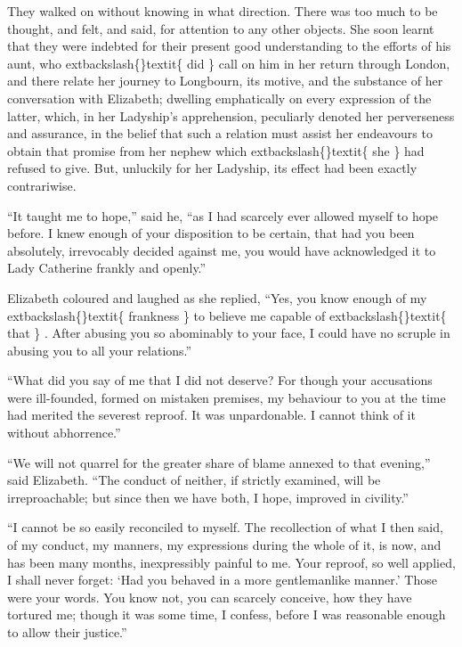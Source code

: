 \documentclass[10pt]{book}
\begin{document}
   They walked on without knowing in what direction. There was too much to
be thought, and felt, and said, for attention to any other objects. She
soon learnt that they were indebted for their present good understanding
to the efforts of his aunt, who
   	extbackslash\{\}textit\{
    did
   \}
   call on him in her return through
London, and there relate her journey to Longbourn, its motive, and the
substance of her conversation with Elizabeth; dwelling emphatically on
every expression of the latter, which, in her Ladyship’s apprehension,
peculiarly denoted her perverseness and assurance, in the belief that
such a relation must assist her endeavours to obtain that promise from
her nephew which
   	extbackslash\{\}textit\{
    she
   \}
   had refused to give. But, unluckily for her
Ladyship, its effect had been exactly contrariwise.
  

   “It taught me to hope,” said he, “as I had scarcely ever allowed myself
to hope before. I knew enough of your disposition to be certain, that
had you been absolutely, irrevocably decided against me, you would have
acknowledged it to Lady Catherine frankly and openly.”
  

   Elizabeth coloured and laughed as she replied, “Yes, you know enough of
my
   	extbackslash\{\}textit\{
    frankness
   \}
   to believe me capable of
   	extbackslash\{\}textit\{
    that
   \}
   . After abusing you so
abominably to your face, I could have no scruple in abusing you to all
your relations.”
  

   “What did you say of me that I did not deserve? For though your
accusations were ill-founded, formed on mistaken premises, my behaviour
to you at the time had merited the severest reproof. It was
unpardonable. I cannot think of it without abhorrence.”
  

   “We will not quarrel for the greater share of blame annexed to that
evening,” said Elizabeth. “The conduct
   of neither, if strictly
examined, will be irreproachable; but since then we have both, I hope,
improved in civility.”
  

   “I cannot be so easily reconciled to myself. The recollection of what I
then said, of my conduct, my manners, my expressions during the whole of
it, is now, and has been many months, inexpressibly painful to me. Your
reproof, so well applied, I shall never forget: ‘Had you behaved in a
more gentlemanlike manner.’ Those were your words. You know not, you can
scarcely conceive, how they have tortured me; though it was some time, I
confess, before I was reasonable enough to allow their justice.”
  
\end{document}
